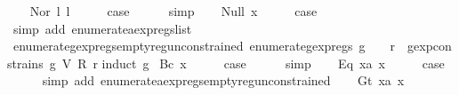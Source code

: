 \begin{isabellebody}
\isamarkupfalse%
\isanewline
\ \ \isamarkupfalse%
\ {\isacharparenleft}Nor\ l{}\ l{}{\isacharparenright}\isanewline
\ \ \isamarkupfalse%
\ \isamarkupfalse%
\ {\isacharquery}case\isanewline
\ \ \ \ \isamarkupfalse%
\ simp\isanewline
{}\isamarkupfalse%
\isanewline
\ \ \isamarkupfalse%
\ {\isacharparenleft}Null\ x{\isacharparenright}\isanewline
\ \ \isamarkupfalse%
\ \isamarkupfalse%
\ {\isacharquery}case\isanewline
\ \ \ \ \isamarkupfalse%
\ {\isacharparenleft}simp\ add{\isacharcolon}\ enumerate{\isacharunderscore}aexp{\isacharunderscore}regs{\isacharunderscore}list{\isacharparenright}\isanewline
{}\isamarkupfalse%
%
\endisatagproof
{\isafoldproof}%
%
\isadelimproof
\isanewline
%
\endisadelimproof
\isanewline
\isanewline
{}\isamarkupfalse%
\ enumerate{\isacharunderscore}gexp{\isacharunderscore}regs{\isacharunderscore}empty{\isacharunderscore}reg{\isacharunderscore}unconstrained{\isacharcolon}\ {\isachardoublequoteopen}enumerate{\isacharunderscore}gexp{\isacharunderscore}regs\ g\ {\isacharequal}\ {\isacharbraceleft}{\isacharbraceright}\ {\isasymLongrightarrow}\ {\isasymforall}r{\isachardot}\ {\isasymnot}\ gexp{\isacharunderscore}constrains\ g\ {\isacharparenleft}V\ {\isacharparenleft}R\ r{\isacharparenright}{\isacharparenright}{\isachardoublequoteclose}\isanewline
%
\isadelimproof
%
\endisadelimproof
%
\isatagproof
{}\isamarkupfalse%
{\isacharparenleft}induct\ g{\isacharparenright}\isanewline
{}\isamarkupfalse%
\ {\isacharparenleft}Bc\ x{\isacharparenright}\isanewline
\ \ \isamarkupfalse%
\ \isamarkupfalse%
\ {\isacharquery}case\isanewline
\ \ \ \ \isamarkupfalse%
\ simp\isanewline
{}\isamarkupfalse%
\isanewline
\ \ \isamarkupfalse%
\ {\isacharparenleft}Eq\ x{}a\ x{}{\isacharparenright}\isanewline
\ \ \isamarkupfalse%
\ \isamarkupfalse%
\ {\isacharquery}case\isanewline
\ \ \ \ \isamarkupfalse%
\ {\isacharparenleft}simp\ add{\isacharcolon}\ enumerate{\isacharunderscore}aexp{\isacharunderscore}regs{\isacharunderscore}empty{\isacharunderscore}reg{\isacharunderscore}unconstrained{\isacharparenright}\isanewline
{}\isamarkupfalse%
\isanewline
\ \ \isamarkupfalse%
\ {\isacharparenleft}Gt\ x{}a\ x{}{\isacharparenright}\isanewline

\end{isabellebody}
